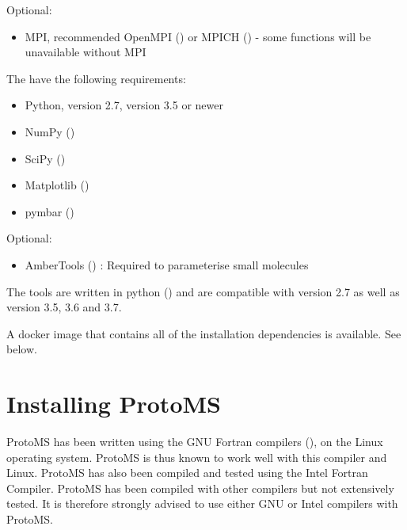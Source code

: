 \documentclass[letterpaper,10pt,english]{sphinxmanual}
\begin{document}
Optional:
\begin{itemize}
\item {} 
MPI, recommended OpenMPI () or MPICH () - some functions will be unavailable without MPI

\end{itemize}

The  have the following requirements:
\begin{itemize}
\item {} 
Python, version 2.7, version 3.5 or newer

\item {} 
NumPy ()

\item {} 
SciPy ()

\item {} 
Matplotlib ()

\item {} 
pymbar ()

\end{itemize}

Optional:
\begin{itemize}
\item {} 
AmberTools ()          : Required to parameterise small molecules

\end{itemize}

The tools are written in python () and are compatible with version 2.7 as well as version 3.5, 3.6 and 3.7.

A docker image that contains all of the installation dependencies is available. See {\hyperref[\detokenize{compilation:using-docker}]{}} below.


\section{Installing ProtoMS}
\label{\detokenize{compilation:installing-protoms}}
ProtoMS has been written using the GNU Fortran compilers (), on the Linux operating system. ProtoMS is thus known to work well with this compiler and Linux. ProtoMS has also been compiled and tested using the Intel Fortran Compiler. ProtoMS has been compiled with other compilers but not extensively tested. It is therefore strongly advised to use either GNU or Intel compilers with ProtoMS.
\end{document}
